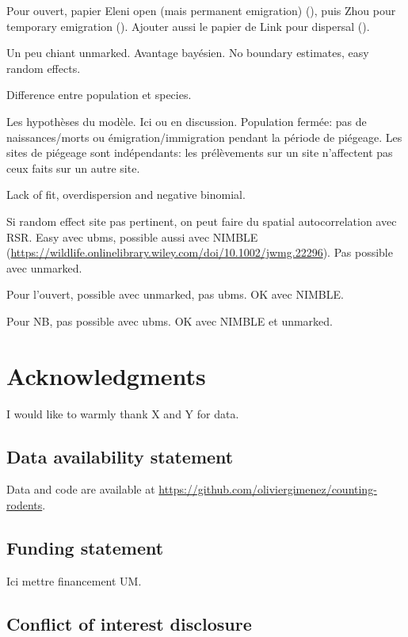 \documentclass[
  11pt,
  a4paper,
]{article}
\begin{document}
Pour ouvert, papier Eleni open (mais permanent emigration) (), puis Zhou pour temporary emigration (). Ajouter aussi le papier de Link pour dispersal ().

Un peu chiant unmarked. Avantage bayésien. No boundary estimates, easy random effects.

Difference entre population et species.

Les hypothèses du modèle. Ici ou en discussion. Population fermée: pas de naissances/morts ou émigration/immigration pendant la période de piégeage. Les sites de piégeage sont indépendants: les prélèvements sur un site n'affectent pas ceux faits sur un autre site.

Lack of fit, overdispersion and negative binomial.

Si random effect site pas pertinent, on peut faire du spatial autocorrelation avec RSR. Easy avec ubms, possible aussi avec NIMBLE (\url{https://wildlife.onlinelibrary.wiley.com/doi/10.1002/jwmg.22296}). Pas possible avec unmarked.

Pour l'ouvert, possible avec unmarked, pas ubms. OK avec NIMBLE.

Pour NB, pas possible avec ubms. OK avec NIMBLE et unmarked.

\section{Acknowledgments}\label{acknowledgments}

I would like to warmly thank X and Y for data.

\subsection{Data availability statement}\label{data-availability-statement}

Data and code are available at \href{https://github.com/oliviergimenez/counting-rodents}{https://github.com/oliviergimenez/counting-rodents}.

\subsection{Funding statement}\label{funding-statement}

Ici mettre financement UM.

\subsection{Conflict of interest disclosure}\label{conflict-of-interest-disclosure}
\end{document}
